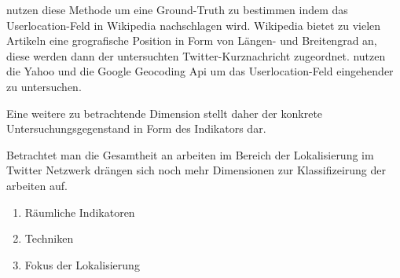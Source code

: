 		\cite{Hecht2011} nutzen diese Methode um eine Ground-Truth zu bestimmen indem das Userlocation-Feld in Wikipedia nachschlagen wird. Wikipedia bietet zu vielen Artikeln eine grografische Position in Form von Längen- und Breitengrad an, diese werden dann der untersuchten Twitter-Kurznachricht zugeordnet. 
		\cite{Hale2012} nutzen die Yahoo und die Google Geocoding Api um das Userlocation-Feld eingehender zu untersuchen.  
		

		
		Eine weitere zu betrachtende Dimension stellt daher der konkrete Untersuchungsgegenstand in Form des Indikators dar.


		Betrachtet man die Gesamtheit an arbeiten im Bereich der Lokalisierung im Twitter Netzwerk drängen sich noch mehr Dimensionen zur Klassifizeirung der arbeiten auf.

		\begin{enumerate}
		 	\item Räumliche Indikatoren
		 	\item Techniken
		 	\item Fokus der Lokalisierung
		 \end{enumerate} 	



	
	
	

	
